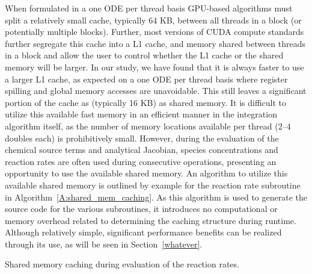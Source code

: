 \documentclass[preprint]{elsarticle}
\makeatletter
\let\OldStatex\Statex
\renewcommand{\Statex}[1][3]{%
  \setlength\@tempdima{\algorithmicindent}%
  \OldStatex\hskip\dimexpr#1\@tempdima\relax}
\makeatother
\begin{document}
When formulated in a one ODE per thread basis GPU-based algorithms must split a relatively small cache, typically 64 KB, between all threads in a block (or potentially multiple blocks).
Further, most versions of CUDA compute standards further segregate this cache into a L1 cache, and memory shared between threads in a block and allow the user to control whether the L1 cache or the shared memory will be larger.
In our study, we have found that it is always faster to use a larger L1 cache, as expected on a one ODE per thread basis where register spilling and global memory accesses are unavoidable.
This still leaves a significant portion of the cache as (typically 16 KB) as shared memory.
It is difficult to utilize this available fast memory in an efficient manner in the integration algorithm itself, as the number of memory locations available per thread (2--4 doubles each) is prohibitively small.
However, during the evaluation of the chemical source terms and analytical Jacobian, species concentrations and reaction rates are often used during consecutive operations, presenting an opportunity to use the available shared memory.
An algorithm to utilize this available shared memory is outlined by example for the reaction rate subroutine in Algorithm~\ref{A:shared_mem_caching}.
As this algorithm is used to generate the source code for the various subroutines, it introduces no computational or memory overhead related to determining the caching structure during runtime.
Although relatively simple, significant performance benefits can be realized through its use, as will be seen in Section~\ref{whatever}.

\begin{algorithm}
\caption{Shared memory caching during evaluation of the reaction rates.}
\label{A:shared_mem_caching}
\end{algorithm}
\end{document}
